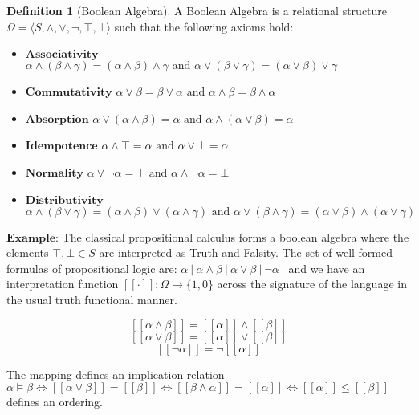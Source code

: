 \documentclass[
]{book}
\theoremstyle{definition}
\newtheorem{definition}{Definition}[chapter]
\theoremstyle{definition}
\theoremstyle{definition}
\theoremstyle{remark}
\begin{document}
\begin{definition}[Boolean Algebra]
\protect\hypertarget{def:unnamed-chunk-15}{}{\label{def:unnamed-chunk-15} \iffalse (Boolean Algebra) \fi{} } A Boolean Algebra is a relational structure \(\Omega = \langle S, \wedge, \vee, \neg, \top, \bot \rangle\) such that the following axioms hold:

\begin{itemize}
\item
  \(\textbf{Associativity }\) \(\alpha \wedge (\beta \wedge \gamma) = (\alpha \wedge \beta) \wedge \gamma \text{      and      } \alpha \vee (\beta \vee \gamma) = (\alpha \vee \beta) \vee \gamma\)
\item
  \(\textbf{Commutativity}\) \(\alpha \vee \beta = \beta \vee \alpha \text{      and      } \alpha \wedge \beta = \beta \wedge \alpha\)
\item
  \(\textbf{Absorption}\) \(\alpha \vee (\alpha \wedge \beta) = \alpha \text{      and      } \alpha \wedge (\alpha \vee \beta) = \alpha\)
\item
  \(\textbf{Idempotence}\) \(\alpha \wedge \top = \alpha \text{      and      } \alpha \vee \bot = \alpha\)
\item
  \(\textbf{Normality}\) \(\alpha \vee \neg\alpha = \top \text{      and      } \alpha \wedge \neg\alpha = \bot\)
\item
  \(\textbf{Distributivity}\) \(\alpha \wedge (\beta \vee \gamma) = (\alpha \wedge \beta) \vee (\alpha \wedge \gamma) \text{      and      } \alpha \vee (\beta \wedge \gamma) = (\alpha \vee \beta) \wedge (\alpha \vee \gamma)\)
\end{itemize}

\(\textbf{Example:}\) The classical propositional calculus forms a boolean algebra where the elements \({\top, \bot \in S}\) are interpreted as Truth and Falsity. The set of well-formed formulas of propositional logic are: \(\alpha \  | \  \alpha \wedge \beta \  | \  \alpha \vee \beta \  | \  \neg\alpha \ |\) and we have an interpretation function \({ [[ \cdot ]] : \Omega \mapsto \{1, 0 \}}\) across the signature of the language in the usual truth functional manner.

\[ [[ \alpha \wedge \beta  ]]  = [[ \alpha  ]] \wedge [[ \beta  ]] \]
\[ [[ \alpha \vee \beta  ]]  = [[ \alpha  ]] \vee [[ \beta  ]] \]
\[ [[ \neg\alpha ]]  = \neg [[ \alpha  ]] \]

The mapping defines an implication relation \(\alpha \models \beta \Leftrightarrow [[ \alpha \vee \beta ]] = [[ \beta ]] \Leftrightarrow [[ \beta \wedge \alpha ]] = [[ \alpha ]] \Leftrightarrow [[ \alpha ]] \leq [[ \beta ]]\) defines an ordering.
\end{definition}
\end{document}

